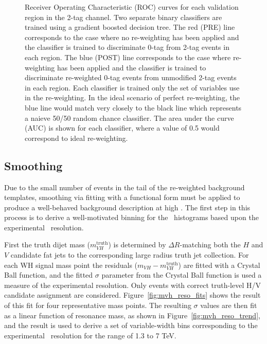 \begin{figure}[htbp!]
\begin{center}
\end{center}
\caption{ Receiver Operating Characteristic (ROC) curves for each validation region in the 2-tag channel. Two separate binary classifiers are trained using a gradient boosted decision tree.
    The red (PRE) line corresponds to the case where no re-weighting has been applied and the classifier is trained to discriminate 0-tag from 2-tag events in each region.
    The blue (POST) line corresponds to the case where re-weighting has been applied and the classifier is trained to discriminate re-weighted 0-tag events from unmodified 2-tag events in each region.
    Each classifier is trained only the set of variables use in the re-weighting.
    In the ideal scenario of perfect re-weighting, the blue line would match very closely to the black line which represents a naieve 50/50 random chance classifier.
    The area under the curve (AUC) is shown for each classifier, where a value of 0.5 would correspond to ideal re-weighting.}
\label{fig:bdt_roc_curves_2tag}
\end{figure}

\subsection{Smoothing}
\label{sec:bkg_fitting}
Due to the small number of events in the tail of the re-weighted background templates, smoothing via fitting with a functional form must be applied to produce a well-behaved background description at high \mvh.
The first step in this process is to derive a well-motivated binning for the \mvh\ histograms based upon the experimental \mvh\ resolution.

First the truth dijet mass ($m_{VH}^{\mathrm{truth}}$) is determined by $\Delta R$-matching both the $H$ and $V$ candidate fat jets to the corresponding  large radius truth jet collection.
For each WH signal mass point the residuals ($m_{VH} - m_{VH}^{\mathrm{truth}}$) are fitted with a Crystal Ball function, and the fitted $\sigma$ parameter from the Crystal Ball function is used a measure of the experimental resolution.
Only events with correct truth-level H/V candidate assignment are considered.
Figure~\ref{fig:mvh_reso_fits} shows the result of this fit for four representative mass points.
The resulting $\sigma$ values are then fit as a linear function of resonance mass, as shown in Figure~\ref{fig:mvh_reso_trend}, and the result is used to derive a set of variable-width bins corresponding to the experimental \mvh\ resolution for the range of 1.3 to 7 TeV.

